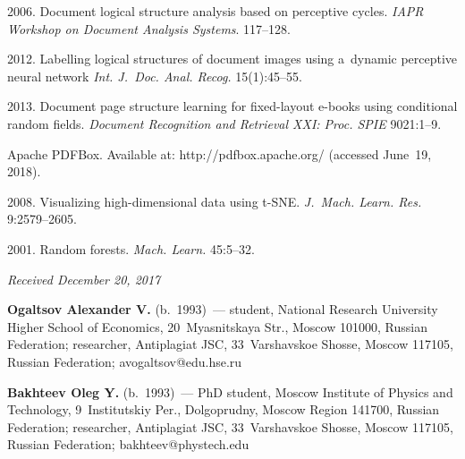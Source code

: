 \begin{multicols}{2}
{{\begin{thebibliography}{99}
        
         2006. 
        Document logical structure analysis based on perceptive cycles.
         \textit{IAPR Workshop on Document Analysis Systems}. 117--128.
        
        2012. Labelling logical structures of document images using a~dynamic 
        perceptive neural network \textit{Int. J.~Doc. Anal. Recog.} 
        15(1):45--55.
        
         2013. Document page structure learning 
        for fixed-layout e-books using conditional random fields. 
        \textit{Document Recognition and Retrieval XXI: Proc. SPIE} 9021:1--9.
        
        {Apache PDFBox}. Available at: {\sf http://pdfbox.apache.\linebreak org/}
        (accessed June~19, 2018).
        
        2008. Visualizing high-dimensional data using t-SNE. \textit{J.~Mach. 
        Learn. Res.} 9:2579--2605.
        
         2001. Random forests. \textit{Mach. Learn.} 45:5--32.
        
        \end{thebibliography}

 }
 }

\end{multicols}

\vspace*{-3pt}

\hfill{\small\textit{Received December 20, 2017}}

        
\Contr

\noindent
\textbf{Ogaltsov Alexander V.} (b.\ 1993)~--- 
student, National Research University Higher School of Economics, 
20~Myasnitskaya Str., Moscow 101000, Russian Federation; researcher, 
Antiplagiat JSC, 33~Varshavskoe Shosse, Moscow 117105, Russian Federation; 
\mbox{avogaltsov@edu.hse.ru}

\vspace*{3pt}

\noindent
\textbf{Bakhteev  Oleg Y.} (b.\ 1993)~--- PhD student, 
Moscow Institute of Physics and Technology, 9~Institutskiy Per., Dolgoprudny, 
Moscow Region 141700, Russian Federation; 
researcher, Antiplagiat JSC, 33~Varshavskoe Shosse, Moscow 117105, Russian Federation; 
\mbox{bakhteev@phystech.edu}


\label{end\stat}


\renewcommand{\bibname}{\protect\rm Литература} 